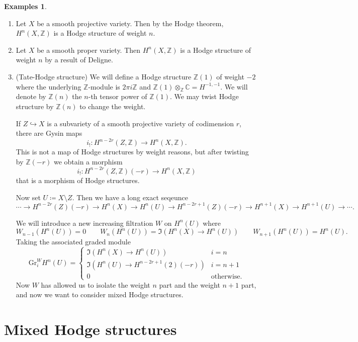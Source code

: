 \documentclass[leqno, openany]{memoir}
\theoremstyle{definition}
\newtheorem{exms}[thm]{Examples}
\theoremstyle{remark}
\theoremstyle{plain}
\theoremstyle{definition}
\theoremstyle{remark}
\newcommand{\C}{\mathbb{C}}
\newcommand{\Z}{\mathbb{Z}}
\newcommand{\mr}[1]{\mathrm{#1}}
\begin{document}
\begin{exms}\leavevmode
    \begin{enumerate}
        \item Let $X$ be a smooth projective variety. Then by the Hodge theorem, $H^n(X, \Z)$ is a Hodge structure of weight $n$.
        \item Let $X$ be a smooth proper variety. Then $H^n(X, \Z)$ is a Hodge structure of weight $n$ by a result of Deligne.
        \item (Tate-Hodge structure) We will define a Hodge structure $\Z(1)$ of weight $-2$ where the underlying $\Z$-module is $2 \pi i \Z$ and $\Z(1) \otimes_{\Z} \C = H^{-1,-1}$. We will denote by $\Z(n)$ the $n$-th tensor power of $\Z(1)$. We may twist Hodge structure by $\Z(n)$ to change the weight.

            If $Z \hookrightarrow X$ is a subvariety of a smooth projective variety of codimension $r$, there are Gysin maps
            \[ i_! \colon H^{n-2r}(Z, \Z) \to H^n(X, \Z). \]
            This is not a map of Hodge structures by weight reasons, but after twisting by $\Z(-r)$ we obtain a morphism
            \[ i_! \colon H^{n-2r}(Z, \Z)(-r) \to H^n(X, \Z) \]
            that is a morphism of Hodge structures.

            Now set $U \coloneqq X \setminus Z$. Then we have a long exact seqeunce
            \[ \cdots \to H^{n-2r}(Z)(-r) \to H^n(X) \to H^n(U) \to H^{n-2r+1}(Z)(-r) \to H^{n+1}(X) \to H^{n+1}(U) \to \cdots. \]

            We will introduce a new increasing filtration $W$ on $H^n(U)$ where
            \[ W_{n-1}(H^n(U)) = 0 \qquad W_n(H^n(U)) = \Im(H^n(X) \to H^n(U)) \qquad W_{n+1}(H^n(U)) = H^n(U). \]
            Taking the associated graded module 
            \[ \mr{Gr}_i^W H^n(U) = \begin{cases}
                \Im(H^n(X) \to H^n(U)) & i = n \\
                \Im(H^n(U) \to H^{n-2r+1}(2)(-r)) & i=n+1 \\
                0 & \text{otherwise}.
            \end{cases} \]
            Now $W$ has allowed us to isolate the weight $n$ part and the weight $n+1$ part, and now we want to consider mixed Hodge structures.
    \end{enumerate}
\end{exms}

\section{Mixed Hodge structures}%
\label{sec:mixed_hodge_structures}
\end{document}
